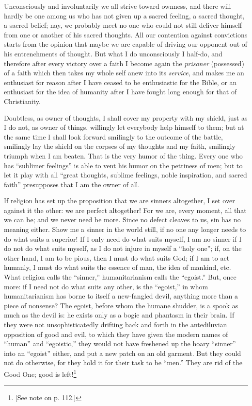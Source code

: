 \documentclass[12pt,a4paper]{book}
\begin{document}
Unconsciously and involuntarily we all strive toward ownness, and there will 
hardly be one among us who has not given up a sacred feeling, a sacred 
thought, a sacred belief; nay, we probably meet no one who could not still 
deliver himself from one or another of his sacred thoughts. All our contention 
against convictions starts from the opinion that maybe we are capable of 
driving our opponent out of his entrenchments of thought. But what I do 
unconsciously I half-do, and therefore after every victory over a faith I 
become again the \textit{prisoner} (possessed) of a faith which then takes my 
whole self anew into its \textit{service}, and makes me an enthusiast for 
reason after I have ceased to be enthusiastic for the Bible, or an enthusiast 
for the idea of humanity after I have fought long enough for that of 
Christianity.

Doubtless, as owner of thoughts, I shall cover my property with my shield, 
just as I do not, as owner of things, willingly let everybody help himself to 
them; but at the same time I shall look forward smilingly to the outcome of 
the battle, smilingly lay the shield on the corpses of my thoughts and my 
faith, smilingly triumph when I am beaten. That is the very humor of the 
thing. Every one who has ``sublimer feelings'' is able to vent his humor on 
the pettiness of men; but to let it play with all ``great thoughts, sublime 
feelings, noble inspiration, and sacred faith'' presupposes that I am the 
owner of all.

If religion has set up the proposition that we are sinners altogether, I set 
over against it the other: we are perfect altogether! For we are, every 
moment, all that we can be; and we never need be more. Since no defect cleaves 
to us, sin has no meaning either. Show me a sinner in the world still, if no 
one any longer needs to do what suits a superior! If I only need do what suits 
myself, I am no sinner if I do not do what suits myself, as I do not injure in 
myself a ``holy one''; if, on the other hand, I am to be pious, then I must 
do what suits God; if I am to act humanly, I must do what suits the essence of 
man, the idea of mankind, etc. What religion calls the ``sinner,'' 
humanitarianism calls the ``egoist.'' But, once more: if I need not do what 
suits any other, is the ``egoist,'' in whom humanitarianism has borne to 
itself a new-fangled devil, anything more than a piece of nonsense? The 
egoist, before whom the humane shudder, is a spook as much as the devil is: he 
exists only as a bogie and phantasm in their brain. If they were not 
unsophisticatedly drifting back and forth in the antediluvian opposition of 
good and evil, to which they have given the modern names of ``human'' and 
``egoistic,'' they would not have freshened up the hoary ``sinner'' into 
an ``egoist'' either, and put a new patch on an old garment. But they could 
not do otherwise, for they hold it for their task to be ``men.'' They are 
rid of the Good One; good is left!\footnote{[See note on p. 112.]}
\end{document}
